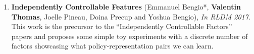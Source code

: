 \begin{enumerate}
\item{\bf Independently Controllable Features} (Emmanuel Bengio*, \textbf{Valentin Thomas}, Joelle Pineau, Doina Precup and Yoshua Bengio), {\em In {\color{blue}RLDM 2017}}.\\
This work is the precursor to the ``Independently Controllable Factors'' papers and proposes some simple toy experiments with a discrete number of factors showcasing what policy-representation pairs we can learn.
\end{enumerate}
